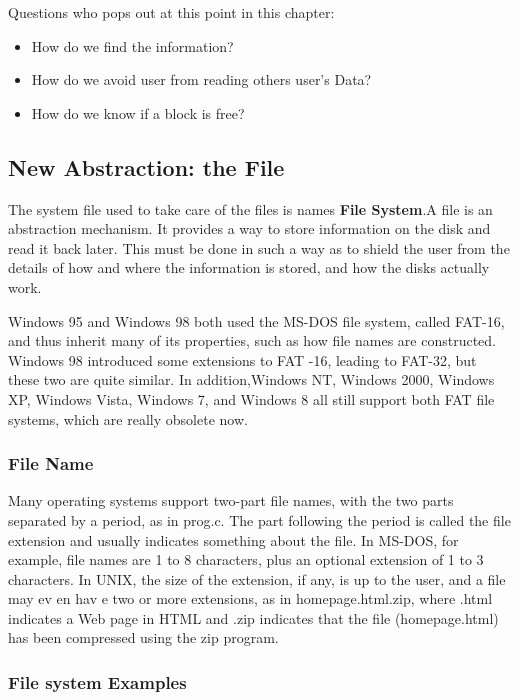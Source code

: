 Questions who pops out at this point in this chapter: 
\begin{itemize}
    \item How do we find the information?
    \item How do we avoid user from reading others user's Data?
    \item How do we know if a block is free?
\end{itemize}

\subsection{New Abstraction: the File}
The system file used to take care of the files is names \textbf{File System}.A file is an abstraction mechanism. It provides a way to store information on the disk and read it back later. This must be done in such a way as to shield the user from the details of how and where the information is stored, and how the disks actually work.

Windows 95 and Windows 98 both used the MS-DOS file system, called FAT-16, and thus inherit many of its properties, such as how file names are constructed. Windows 98 introduced some extensions to FAT -16, leading to FAT-32, but these two are quite similar. In addition,Windows NT, Windows 2000, Windows XP, Windows Vista, Windows 7, and Windows 8 all still support both FAT file systems, which are really obsolete now.
\subsubsection{File Name}                                                

Many operating systems support two-part file names, with the two parts separated by a period, as in prog.c. The part following the period is called the file extension and usually indicates something about the file. In MS-DOS, for example, file names are 1 to 8 characters, plus an optional extension of 1 to 3 characters. In UNIX, the size of the extension, if any, is up to the user, and a file may ev en hav e two or more extensions, as in homepage.html.zip, where .html indicates a Web page in HTML and .zip indicates that the file (homepage.html) has been compressed using the zip program.


\subsubsection{File system Examples}                                                

